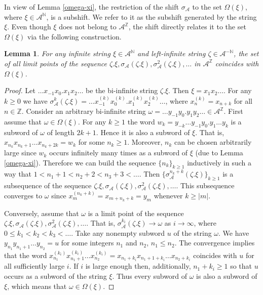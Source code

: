 \documentclass[12pt]{article}
\newtheorem{lemma}[theorem]{Lemma}
\theoremstyle{definition}
\def\bN{\mathbb{N}}
\def\bZ{\mathbb{Z}}
\def\cA{\mathcal{A}}
\def\om{\omega}
\def\si{\sigma}
\def\Om{\Omega}
\begin{document}
In view of Lemma \ref{omega-xi}, the restriction of the shift $\si_{\cA}$ 
to the set $\Om(\xi)$, where $\xi\in\cA^{\bN}$, is a subshift.  We refer to 
it as the subshift generated by the string $\xi$.  Even though $\xi$ does 
not belong to $\cA^{\bZ}$, the shift directly relates it to the set 
$\Om(\xi)$ via the following construction.

\begin{lemma}\label{limit-points}
For any infinite string $\xi\in\cA^{\bN}$ and left-infinite string 
$\zeta\in\cA^{-\bN}$, the set of all limit points of the sequence 
$\zeta.\xi,\si_{\cA}(\zeta.\xi),\si_{\cA}^2(\zeta.\xi),\dots$ in 
$\cA^{\bZ}$ coincides with $\Omega(\xi)$.
\end{lemma}

\begin{proof}
Let $\ldots x_{-1}x_0.x_1x_2\ldots$ be the bi-infinite string $\zeta.\xi$.  
Then $\xi=x_1x_2\ldots$.  For any $k\ge0$ we have $\si_{\cA}^k(\zeta.\xi)= 
\ldots x^{(k)}_{-1}x^{(k)}_0.x^{(k)}_1x^{(k)}_2\ldots$, where 
$x^{(k)}_n=x_{n+k}$ for all $n\in\bZ$.  Consider an arbitrary bi-infinite 
string $\om=\ldots y_{-1}y_0.y_1y_2\ldots\in\cA^{\bZ}$.  First assume that 
$\om\in\Om(\xi)$.  For any $k\ge1$ the word $w_k=y_{-k}\ldots 
y_{-1}y_0.y_1\ldots y_k$ is a subword of $\om$ of length $2k+1$.  Hence it 
is also a subword of $\xi$.  That is, $x_{n_k}x_{n_k+1}\ldots 
x_{n_k+2k}=w_k$ for some $n_k\ge1$.  Moreover, $n_k$ can be chosen 
arbitrarily large since $w_k$ occurs infinitely many times as a subword of 
$\xi$ (due to Lemma \ref{omega-xi}).  Therefore we can build the sequence 
$\{n_k\}_{k\ge1}$ inductively in such a way that $1<n_1+1<n_2+2<n_3+3< 
\ldots$.  Then $\{\si_{\cA}^{n_k+k}(\zeta.\xi)\}_{k\ge1}$ is a subsequence 
of the sequence $\zeta.\xi,\si_{\cA}(\zeta.\xi),\si_{\cA}^2(\zeta.\xi), 
\dots$.  This subsequence converges to $\om$ since 
$x^{(n_k+k)}_m=x_{m+n_k+k}=y_m$ whenever $k\ge|m|$.

Conversely, assume that $\om$ is a limit point of the sequence 
$\zeta.\xi,\si_{\cA}(\zeta.\xi),\si_{\cA}^2(\zeta.\xi),\dots$.  That is, 
$\si_{\cA}^{k_i}(\zeta.\xi)\to\om$ as $i\to\infty$, where $0\le 
k_1<k_2<k_3<\ldots$.  Take any nonempty subword $u$ of the string $\om$.  
We have $y_{n_1}y_{n_1+1}\ldots y_{n_2}=u$ for some integers $n_1$ and 
$n_2$, $n_1\le n_2$.  The convergence implies that the word 
$x^{(k_i)}_{n_1}x^{(k_i)}_{n_1+1}\ldots x^{(k_i)}_{n_2}= 
x_{n_1+k_i}x_{n_1+1+k_i}\ldots x_{n_2+k_i}$ coincides with $u$ for all 
sufficiently large $i$.  If $i$ is large enough then, additionally, 
$n_1+k_i\ge1$ so that $u$ occurs as a subword of the string $\xi$.  Thus 
every subword of $\om$ is also a subword of $\xi$, which means that 
$\om\in\Om(\xi)$.
\end{proof}
\end{document}
